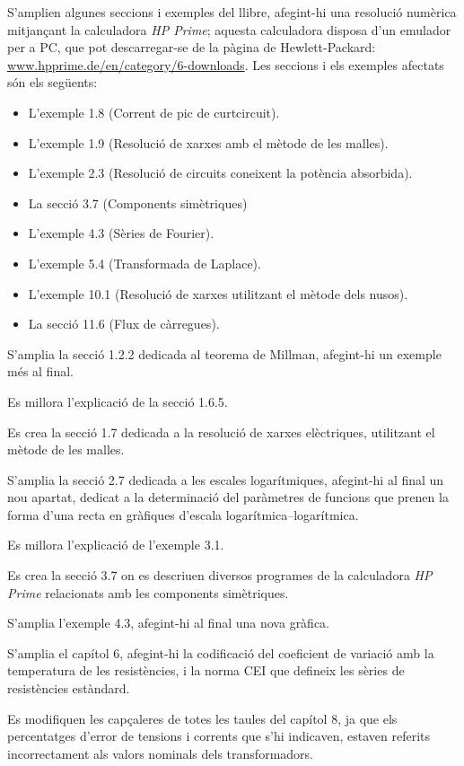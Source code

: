 S'amplien algunes seccions i exemples del llibre, afegint-hi una  resolució numèrica mitjançant la calculadora \emph{HP Prime};  aquesta calculadora disposa d'un emulador per a PC, que pot descarregar-se de la pàgina de Hewlett-Packard: \href{http://www.hpprime.de/en/category/6-downloads}{www.hpprime.de/en/category/6-downloads}. Les seccions i els exemples afectats són els següents:
\begin{itemize}
  \item L'exemple 1.8  (Corrent de pic de curtcircuit).
  \item L'exemple 1.9 (Resolució de xarxes amb el mètode de les malles).
  \item L'exemple 2.3 (Resolució de circuits coneixent la potència absorbida).
  \item La secció 3.7 (Components simètriques)
  \item L'exemple 4.3 (Sèries de Fourier).
  \item L'exemple 5.4 (Transformada de Laplace).
  \item L'exemple 10.1 (Resolució de xarxes utilitzant el mètode dels nusos).
  \item La secció 11.6 (Flux de càrregues).
\end{itemize}

S'amplia la secció 1.2.2 dedicada al teorema de Millman, afegint-hi un exemple més al final.

Es millora l'explicació de la secció 1.6.5.

Es crea la secció 1.7 dedicada a la resolució de xarxes elèctriques, utilitzant el mètode de les malles.

S'amplia la secció 2.7 dedicada a les escales logarítmiques, afegint-hi al final un nou apartat, dedicat a la determinació del paràmetres de funcions que prenen la forma d'una recta en gràfiques d'escala logarítmica--logarítmica.

Es millora l'explicació de l'exemple 3.1.

Es crea la secció 3.7 on es descriuen diversos programes de la calculadora
\emph{HP Prime} relacionats amb les components simètriques.

S'amplia l'exemple 4.3, afegint-hi al final  una nova gràfica.

S'amplia el capítol 6, afegint-hi la codificació del coeficient de variació amb la temperatura de les resistències, i la norma CEI que defineix les sèries de resistències estàndard.

Es modifiquen les capçaleres de totes les taules del capítol 8, ja que els percentatges d'error de tensions i corrents que s'hi indicaven, estaven referits incorrectament als valors nominals dels transformadors.

